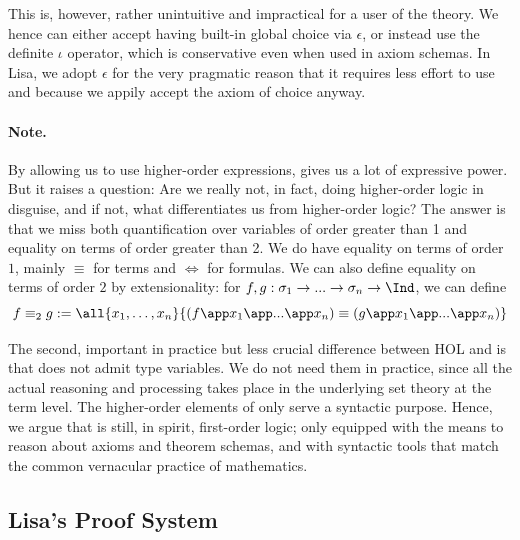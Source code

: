 This is, however, rather unintuitive and impractical for a user of the theory. We hence can either accept having built-in global choice via $\epsilon$, or instead use the definite $\iota$ operator, which is conservative even when used in axiom schemas. In Lisa, we adopt $\epsilon$ for the very pragmatic reason that it requires less effort to use and because we appily accept the axiom of choice anyway.



\paragraph{Note.} By allowing us to use higher-order expressions, \lamfol gives us a lot of expressive power. But it raises a question: Are we really not, in fact, doing higher-order logic in disguise, and if not, what differentiates us from higher-order logic? The answer is that we miss both quantification over variables of order greater than 1 and equality on terms of order greater than 2. We do have equality on terms of order $1$, mainly $\equiv$ for terms and $\iff$ for formulas. We can also define equality on terms of order $2$ by extensionality: for $f, g: \sigma_1 \to ... \to \sigma_n \to \Ind$, we can define 
$$f \equiv_2 g := \all{x_1, \ldots, x_n}{(f \app x_1 \app ... \app x_n) \equiv (g \app x_1 \app ... \app x_n)}
$$

The second, important in practice but less crucial difference between HOL and \lamfol is that \lamfol does not admit type variables. We do not need them in practice, since all the actual reasoning and processing takes place in the underlying set theory at the term level. The higher-order elements of \lamfol only serve a syntactic purpose. Hence, we argue that \lamfol is still, in spirit, first-order logic; only equipped with the means to reason about axioms and theorem schemas, and with syntactic tools that match the common vernacular practice of mathematics.


\subsection{Lisa's Proof System}



